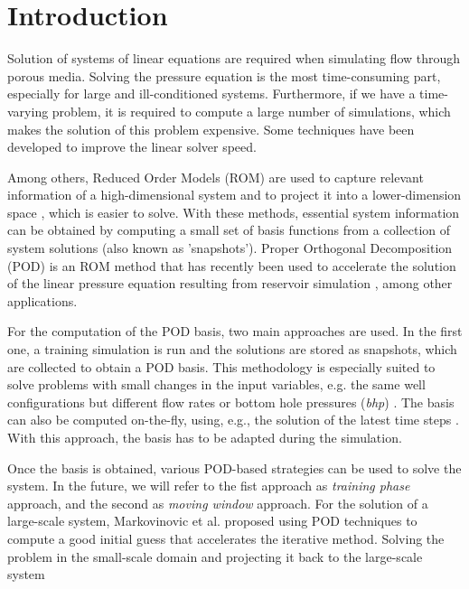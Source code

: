\documentclass[times,final]{elsarticle}
\begin{document}
\section{Introduction}\label{intro}
\hspace{0.5cm}Solution of systems of linear equations are required when 
simulating flow through porous media.
Solving the pressure equation is the most time-consuming part, especially for large and 
ill-conditioned systems. Furthermore, if we have a time-varying problem, it is required 
to compute a large number of simulations, which makes the solution of this problem expensive.
Some techniques have been developed to improve the linear solver speed.\par 
Among others,
Reduced Order Models (ROM) are used to capture 
relevant information of a high-dimensional system and to project it into a lower-dimension 
space \cite{Vermeulen04,Pasetto16,Schilders08,Quarteroni14,Carlberg15}, which is easier to solve. 
With these methods, essential system information can be obtained by computing a small set of basis 
functions from a collection of system solutions (also known as 'snapshots'). 
Proper Orthogonal Decomposition (POD) is an ROM method that has recently been used to  
accelerate the solution of the linear pressure equation resulting from reservoir simulation 
\cite{Astrid11,Mark06,Cardoso09,Heijn04,Doren06}, among other applications. \par
For the computation of the POD basis, two main approaches are used. In the first one, a training 
simulation is run and the solutions are stored as snapshots, which are collected to obtain a POD basis. This methodology is
especially suited to solve problems with small changes in the input variables, e.g.
the same well configurations but different flow rates or bottom hole pressures (\emph{bhp}) \cite{Heijn04,Astrid11,Cardoso09}. 
The basis can also be computed on-the-fly, using, e.g., the solution of the latest time steps \cite{Mark06,Astrid11,Diaz17}. With this approach, the basis has to be adapted during the simulation. \par
Once the basis is obtained, various POD-based strategies can be used to solve the system.
In the future, we will refer to the fist approach as \emph{training phase} approach, and the second as \emph{moving window} approach.
For the 
solution of a large-scale system, Markovinovic et al. \cite{Mark06} proposed using POD techniques to compute a good 
initial guess that accelerates the iterative method. Solving the problem in the small-scale domain 
and projecting it back to the large-scale system
\end{document}
